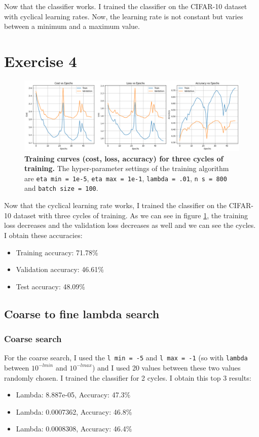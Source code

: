 \documentclass{article}
\begin{document}
Now that the classifier works. I trained the classifier on the CIFAR-10 dataset with cyclical learning rates. Now, the learning rate is not constant but varies between a minimum and a maximum value.

\section{Exercise 4}

\begin{figure}[H]
    \centering
    \includegraphics[width=\linewidth]{Result_Pics/ex4.png}
    \caption{\textbf{Training curves (cost, loss, accuracy) for three cycles of training.} The hyper-parameter settings
        of the training algorithm are \texttt{eta min = 1e-5}, \texttt{eta max = 1e-1}, \texttt{lambda = .01}, \texttt{n s = 800} and \texttt{batch size = 100}.}
    \label{fig:ex4}
\end{figure}

Now that the cyclical learning rate works, I trained the classifier on the CIFAR-10 dataset with three cycles of training. As we can see in figure \ref{fig:ex4}, the training loss decreases and the validation loss decreases as well and we can see the cycles. I obtain these accuracies:
\begin{itemize}
    \item Training accuracy: 71.78\%
    \item Validation accuracy: 46.61\%
    \item Test accuracy: 48.09\%
\end{itemize}

\subsection{Coarse to fine lambda search}

\subsubsection{Coarse search}
For the coarse search, I used the \texttt{l min = -5} and \texttt{l max = -1} (so with \texttt{lambda} between \texttt{$10^{-l min}$} and \texttt{$10^{-l max}$}) and I used 20 values between these two values randomly chosen. I trained the classifier for 2 cycles. I obtain this top 3 results:
\begin{itemize}
    \item Lambda: 8.887e-05, Accuracy: 47.3\%
    \item Lambda: 0.0007362, Accuracy: 46.8\%
    \item Lambda: 0.0008308, Accuracy: 46.4\%
\end{itemize}
\end{document}
